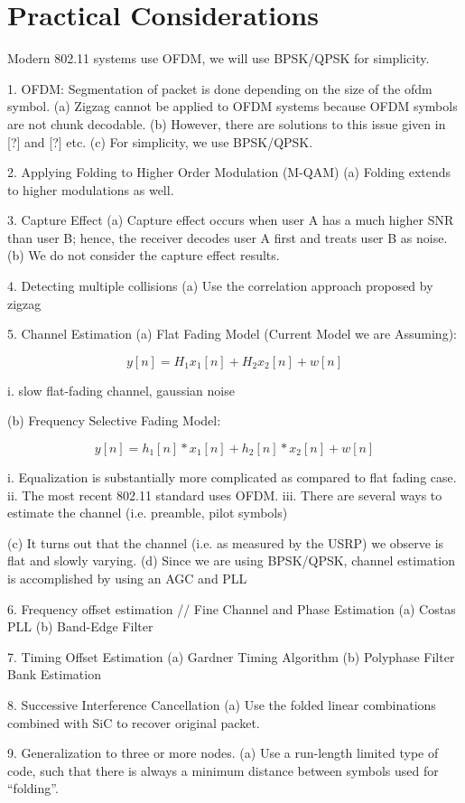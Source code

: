\section{Practical Considerations}
\label{sec:practical}

Modern 802.11 systems use OFDM, we will use BPSK/QPSK for simplicity.

1. OFDM: Segmentation of packet is done depending on the size of the ofdm symbol.
(a) Zigzag cannot be applied to OFDM systems because OFDM symbols are not chunk decodable. 
(b) However, there are solutions to this issue given in [?] and [?] etc.
(c) For simplicity, we use BPSK/QPSK.

2. Applying Folding to Higher Order Modulation (M-QAM)
(a) Folding extends to higher modulations as well.

3. Capture Effect
(a) Capture effect occurs when user A has a much higher SNR than user B; hence, the receiver decodes user A first and treats user B as noise. 
(b) We do not consider the capture effect results.

4. Detecting multiple collisions 
(a) Use the correlation approach proposed by zigzag

5. Channel Estimation
(a) Flat Fading Model (Current Model we are Assuming):

\begin{equation}
\label{eq:flat}
y[n]=H_{1}x_{1}[n]+H_{2}x_{2}[n]+w[n]
\end{equation}

i. slow flat-fading channel, gaussian noise

(b) Frequency Selective Fading Model:

\begin{equation}
\label{eq:selective}
y[n]=h_{1}[n]*x_{1}[n]+h_{2}[n]*x_{2}[n]+w[n]
\end{equation}

i. Equalization is substantially more complicated as compared to flat fading case.
ii. The most recent 802.11 standard uses OFDM.
iii. There are several ways to estimate the channel (i.e. preamble, pilot symbols)

(c) It turns out that the channel (i.e. as measured by the USRP) we observe is flat and slowly varying. 
(d) Since we are using BPSK/QPSK, channel estimation is accomplished by using an AGC and PLL

6. Frequency offset estimation // Fine Channel and Phase Estimation
(a) Costas PLL 
(b) Band-Edge Filter

7. Timing Offset Estimation
(a) Gardner Timing Algorithm
(b) Polyphase Filter Bank Estimation

8. Successive Interference Cancellation
(a) Use the folded linear combinations combined with SiC to recover original packet.

9. Generalization to three or more nodes.
(a) Use a run-length limited type of code, such that there is always a minimum distance between symbols used for ``folding''.
